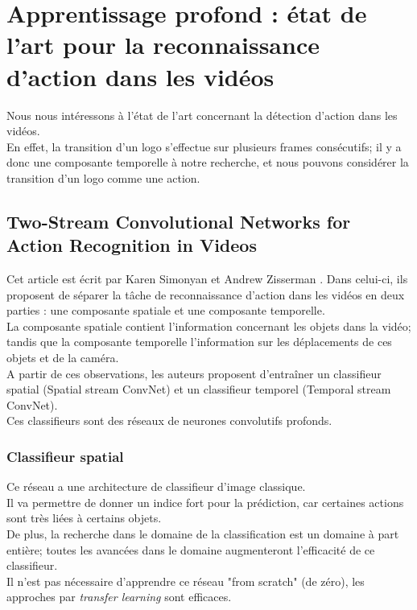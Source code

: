 \documentclass[11pt]{article}
\begin{document}
\newpage
\section{Apprentissage profond : état de l'art pour la reconnaissance d'action dans les vidéos}
\label{sec:org1c221af}
Nous nous intéressons à l'état de l'art concernant la détection d'action dans les vidéos.\\
En effet, la transition d'un logo s'effectue sur plusieurs frames consécutifs; il y a donc une composante temporelle à notre recherche, et nous pouvons considérer la transition d'un logo comme une action.\\

\subsection{Two-Stream Convolutional Networks for Action Recognition in Videos}
\label{sec:orgf3356c9}
Cet article est écrit par Karen Simonyan et Andrew Zisserman \cite{DBLP:journals/corr/SimonyanZ14}. Dans celui-ci, ils proposent de séparer la tâche de reconnaissance d'action dans les vidéos en deux parties : une composante spatiale et une composante temporelle.\\

La composante spatiale contient l'information concernant les objets dans la vidéo; tandis que la composante temporelle l'information sur les déplacements de ces objets et de la caméra.\\
A partir de ces observations, les auteurs proposent d'entraîner un classifieur spatial (Spatial stream ConvNet) et un classifieur temporel (Temporal stream ConvNet).\\

Ces classifieurs sont des réseaux de neurones convolutifs profonds.\\

\subsubsection{Classifieur spatial}
\label{sec:orgedab299}
Ce réseau a une architecture de classifieur d'image classique.\\
Il va permettre de donner un indice fort pour la prédiction, car certaines actions sont très liées à certains objets.\\
De plus, la recherche dans le domaine de la classification est un domaine à part entière; toutes les avancées dans le domaine augmenteront l'efficacité de ce classifieur.\\
Il n'est pas nécessaire d'apprendre ce réseau "from scratch" (de zéro), les approches par \emph{transfer learning} sont efficaces.\\
\end{document}
